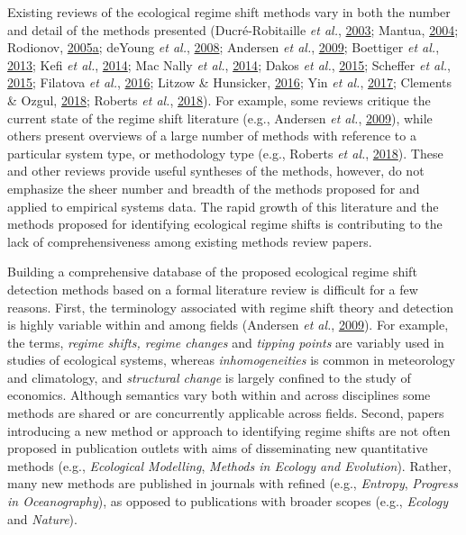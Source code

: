 \documentclass[12pt,twoside,openany]{reedthesis}
\begin{document}
Existing reviews of the ecological regime shift methods vary in both the number and detail of the methods presented (Ducré-Robitaille \emph{et al.}, \protect\hyperlink{ref-ducre2003comparison}{2003}; Mantua, \protect\hyperlink{ref-mantua_methods_2004}{2004}; Rodionov, \protect\hyperlink{ref-rodionov_brief_2005}{2005}\protect\hyperlink{ref-rodionov_brief_2005}{a}; deYoung \emph{et al.}, \protect\hyperlink{ref-deyoung_regime_2008}{2008}; Andersen \emph{et al.}, \protect\hyperlink{ref-andersen_ecological_2009}{2009}; Boettiger \emph{et al.}, \protect\hyperlink{ref-boettiger_early_2013}{2013}; Kefi \emph{et al.}, \protect\hyperlink{ref-kefi2014early}{2014}; Mac Nally \emph{et al.}, \protect\hyperlink{ref-mac2014scrutiny}{2014}; Dakos \emph{et al.}, \protect\hyperlink{ref-dakos2015resilience}{2015}; Scheffer \emph{et al.}, \protect\hyperlink{ref-scheffer2015generic}{2015}; Filatova \emph{et al.}, \protect\hyperlink{ref-filatova2016regime}{2016}; Litzow \& Hunsicker, \protect\hyperlink{ref-litzow_early_2016}{2016}; Yin \emph{et al.}, \protect\hyperlink{ref-yin2017methods}{2017}; Clements \& Ozgul, \protect\hyperlink{ref-clements2018indicators}{2018}; Roberts \emph{et al.}, \protect\hyperlink{ref-roberts2018early}{2018}). For example, some reviews critique the current state of the regime shift literature (e.g., Andersen \emph{et al.}, \protect\hyperlink{ref-andersen_ecological_2009}{2009}), while others present overviews of a large number of methods with reference to a particular system type, or methodology type (e.g., Roberts \emph{et al.}, \protect\hyperlink{ref-roberts2018early}{2018}). These and other reviews provide useful syntheses of the methods, however, do not emphasize the sheer number and breadth of the methods proposed for and applied to empirical systems data. The rapid growth of this literature and the methods proposed for identifying ecological regime shifts is contributing to the lack of comprehensiveness among existing methods review papers.

Building a comprehensive database of the proposed ecological regime shift detection methods based on a formal literature review is difficult for a few reasons. First, the terminology associated with regime shift theory and detection is highly variable within and among fields (Andersen \emph{et al.}, \protect\hyperlink{ref-andersen_ecological_2009}{2009}). For example, the terms, \emph{regime shifts, regime changes} and \emph{tipping points} are variably used in studies of ecological systems, whereas \emph{inhomogeneities} is common in meteorology and climatology, and \emph{structural change} is largely confined to the study of economics. Although semantics vary both within and across disciplines some methods are shared or are concurrently applicable across fields. Second, papers introducing a new method or approach to identifying regime shifts are not often proposed in publication outlets with aims of disseminating new quantitative methods (e.g., \emph{Ecological Modelling}, \emph{Methods in Ecology and Evolution}). Rather, many new methods are published in journals with refined (e.g., \emph{Entropy}, \emph{Progress in Oceanography}), as opposed to publications with broader scopes (e.g., \emph{Ecology} and \emph{Nature}).
\end{document}
